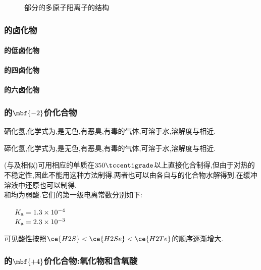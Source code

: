 \documentclass{ctexart}
\begin{document}
\begin{figure}[H]
{\begin{minipage}[b]{.45\linewidth}
        \end{minipage}
    }
    \caption{部分的多原子阳离子的结构}
\end{figure}
\subsubsection{的卤化物}
\paragraph{的低卤化物}
\paragraph{的四卤化物}
\paragraph{的六卤化物}
\subsubsection{的$\mbf{-2}$价化合物}
\begin{substance}[\ce{H2Se}]
    硒化氢,化学式为,是无色,有恶臭,有毒的气体,可溶于水,溶解度与相近.
\end{substance}
\begin{substance}[\ce{H2Te}]
    碲化氢,化学式为,是无色,有恶臭,有毒的气体,可溶于水,溶解度与相近.
\end{substance}
(与及相似)可用相应的单质在$350\tccentigrade$以上直接化合制得,但由于对热的不稳定性,因此不能用这种方法制得.两者也可以由各自与的化合物水解得到.在缓冲溶液中还原也可以制得.\\
\indent {}和均为弱酸.它们的第一级电离常数分别如下:
\begin{center}
    \ \ \ $K_\text a=1.3\times10^{-4}$\\
    \ \ \ $K_\text a=2.3\times10^{-3}$
\end{center}
可见酸性按照$\ce{H2S}<\ce{H2Se}<\ce{H2Te}$的顺序逐渐增大.
\subsubsection{的$\mbf{+4}$价化合物:氧化物和含氧酸}
\end{document}
